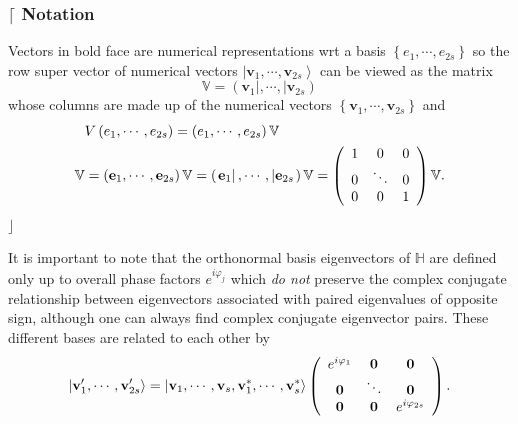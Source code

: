 \documentclass[aps,preprint]{revtex4}%
\begin{document}
\subsubsection{$\lceil$ Notation}

Vectors in bold face are numerical representations wrt a basis $\left\{
e_{1},\cdots,e_{2s}\right\}  $ so the row super vector of numerical vectors
$\left\vert \mathbf{v}_{1},\cdots,\mathbf{v}_{2s}\right\rangle $ can be viewed
as the matrix
\begin{equation}
\mathbb{V}=\left(  \left.  \mathbf{v}_{1}\right\vert ,\cdots,\left\vert
\mathbf{v}_{2s}\right.  \right)
\end{equation}
whose columns are made up of the numerical vectors $\left\{  \mathbf{v}%
_{1},\cdots,\mathbf{v}_{2s}\right\}  $ and
\begin{align}
&  V\left(  e_{1},\cdots,e_{2s}\right)  =\left(  e_{1},\cdots,e_{2s}\right)
\mathbb{V}\\
\mathbb{V}  &  =\left(  \mathbf{e}_{1},\cdots,\mathbf{e}_{2s}\right)
\mathbb{V}=\left(  \left.  \mathbf{e}_{1}\right\vert ,\cdots,\left\vert
\mathbf{e}_{2s}\right.  \right)  \mathbb{V}=\left(
\begin{array}
[c]{ccc}%
1 & 0 & 0\\
0 & \ddots & 0\\
0 & 0 & 1
\end{array}
\right)  \mathbb{V}.
\end{align}
$\rfloor$

It is important to note that the orthonormal basis eigenvectors of
$\mathbb{H}$ are defined only up to overall phase factors $e^{i\varphi_{j}}$
which \emph{do not} preserve the complex conjugate relationship between
eigenvectors associated with paired eigenvalues of opposite sign, although one
can always find complex conjugate eigenvector pairs. These different bases are
related to each other by
\begin{equation}
\left\vert \mathbf{v}_{1}^{\prime},\cdots,\mathbf{v}_{2s}^{\prime
}\right\rangle =\left\vert \mathbf{v}_{1},\cdots,\mathbf{v}_{s},\mathbf{v}%
_{1}^{\ast},\cdots,\mathbf{v}_{s}^{\ast}\right\rangle \left(
\begin{array}
[c]{ccc}%
e^{i\varphi_{1}} & \mathbf{0} & \mathbf{0}\\
\mathbf{0} & \ddots & \mathbf{0}\\
\mathbf{0} & \mathbf{0} & e^{i\varphi_{2s}}%
\end{array}
\right)  .
\end{equation}
\end{document}
